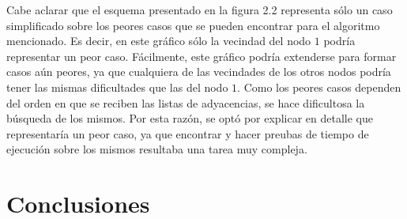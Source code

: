 \documentclass[a4paper,11pt] {article}
\begin{document}
Cabe aclarar que el esquema presentado en la figura 2.2 representa s\'olo un caso simplificado sobre los peores casos que se pueden encontrar para el algoritmo mencionado. Es decir, en este gr\'afico s\'olo la vecindad del nodo $1$ podr\'ia representar un peor caso. F\'acilmente, este gr\'afico podr\'ia extenderse para formar casos a\'un peores, ya que cualquiera de las vecindades de los otros nodos podr\'ia tener las mismas dificultades que las del nodo $1$. Como los peores casos dependen del orden en que se reciben las listas de adyacencias, se hace dificultosa la b\'usqueda de los mismos. Por esta raz\'on, se opt\'o por explicar en detalle que representar\'ia un peor caso, ya que encontrar y hacer preubas de tiempo de ejecuci\'on sobre los mismos resultaba una tarea muy compleja.

\section*{Conclusiones}

% 
% 
% 
\end{document}
